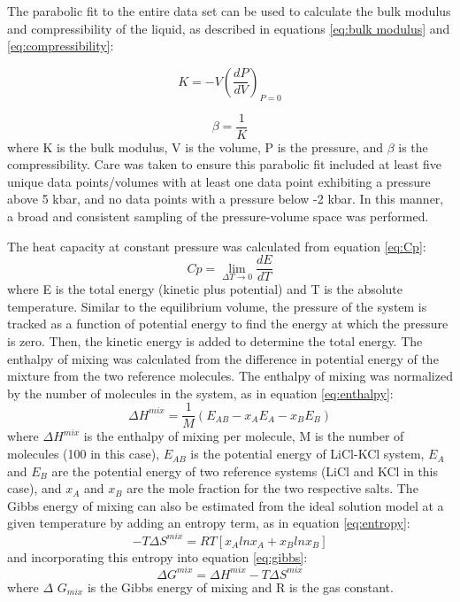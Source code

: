 \documentclass[review]{elsarticle}
\begin{document}
The parabolic fit to the entire data set can be used to calculate the bulk modulus and compressibility of the liquid, as described in equations \ref{eq:bulk modulus} and \ref{eq:compressibility}:

\begin{equation}
\label{eq:bulk modulus}
K = -V {(\frac{dP}{dV})}_{P=0}
\end{equation}

\begin{equation}
\label{eq:compressibility}
\beta = \frac{1}{K}
\end{equation}where K is the bulk modulus, V is the volume, P is the pressure, and $\beta$ is the compressibility. Care was taken to ensure this parabolic fit included at least five unique data points/volumes with at least one data point exhibiting a pressure above 5 kbar, and no data points with a pressure below  -2 kbar. In this manner, a broad and consistent sampling of the pressure-volume space was performed. 

The heat capacity at constant pressure was calculated from equation \ref{eq:Cp}:
\begin{equation}
\label{eq:Cp}
Cp =\lim_{\Delta T\to0} \frac{dE}{dT}
\end{equation}
where E is the total energy (kinetic plus potential) and T is the absolute temperature. Similar to the equilibrium volume, the pressure of the system is tracked as a function of potential energy to find the energy at which the pressure is zero. Then, the kinetic energy is added to determine the total energy. The enthalpy of mixing was calculated from the difference in potential energy of the mixture from the two reference molecules. The enthalpy of mixing was normalized by the number of molecules in the system, as in equation \ref{eq:enthalpy}:
\begin{equation}
    \label{eq:enthalpy}
    \Delta H^{mix} = \frac{1}{M}(E_{AB} - x_A E_A - x_B E_B)
\end{equation} 
where $\Delta H^{mix}$ is the enthalpy of mixing per molecule, M is the number of molecules (100 in this case), $E_{AB}$ is the potential energy of LiCl-KCl system, $E_A$ and $E_B$ are the potential energy of two reference systems (LiCl and KCl in this case), and $x_A$ and $x_B$ are the mole fraction for the two respective salts. The Gibbs energy of mixing can also be estimated from the ideal solution model \cite{dehoff2006} at a given temperature by adding an entropy term, as in equation \ref{eq:entropy}: 
\begin{equation}
    \label{eq:entropy}
    -T \Delta S^{mix}= RT[x_A ln x_A + x_B ln x_B]
\end{equation}and incorporating this entropy into  equation \ref{eq:gibbs}:
\begin{equation}
    \label{eq:gibbs}
    \Delta G^{mix} = \Delta H^{mix} -T \Delta S^{mix}
\end{equation}
where $\Delta$ $G_{mix}$ is the Gibbs energy of mixing and R is the gas constant.
\end{document}
